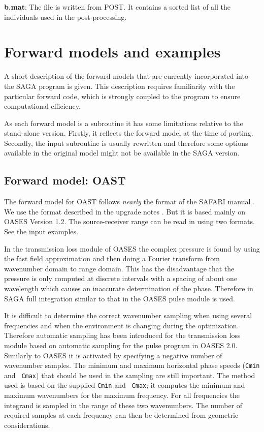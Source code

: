 \documentclass{saclantc}
\begin{document}
{\bf *b.mat}: The file is written from {\sf POST}. 
It contains a sorted list of  all the individuals used in
the post-processing. 

%
\newpage
\section{Forward models and examples}  
\label{se:forw}
A short description of the forward models that are currently
incorporated into the {\sf SAGA } program is given. This description
requires familiarity with the particular forward code, which
is strongly coupled to the program  to ensure computational
efficiency.

As each forward model is a subroutine it has some limitations relative
to the stand-alone version. Firstly, it reflects the forward model at the
time of porting. Secondly, the input subroutine is usually rewritten
and therefore some options available in the original model might not
be available in the {\sf SAGA} version.

\subsection{Forward model: OAST }
\label{se:oast}
The forward model for  {\sf OAST} \rm follows 
{\it nearly} the format of the {\sf SAFARI}
manual \cite{hs:saf}. 
We use the format described in the upgrade notes \cite{hs:saf2}.
But it is based mainly on {\sf OASES} Version 1.2.
The source-receiver range can be read in 
using two formats. See the input examples.

In the transmission loss module of {\sf OASES} the complex pressure is found
by using the fast field approximation and then doing a Fourier transform
from wavenumber domain to range domain.
This has the disadvantage that the pressure is only computed at
discrete intervals with a spacing of about one wavelength which causes
an inaccurate determination of the phase. Therefore in
{\sf SAGA}
 full integration similar to that in the {\sf OASES} pulse module is
used.

It is difficult to determine the correct wavenumber
sampling when using several frequencies and when the environment is
changing during the optimization. Therefore  automatic
sampling has been introduced for the transmission loss module
 based on automatic sampling for the pulse program in {\sf OASES} 2.0. 
Similarly to {\sf OASES} it is activated by specifying a 
negative number of wavenumber samples.
The minimum and maximum horizontal phase speeds ({\tt Cmin} and {\tt
Cmax}) 
that should be used in the sampling are still important. 
The  method used is  based on the supplied {\tt Cmin} and {\tt
Cmax}; it computes the minimum and maximum wavenumbers  for the
maximum frequency. For all frequencies the integrand is sampled in the
range of these two wavenumbers. The number of required samples at each
frequency can then be determined from geometric considerations.
\end{document}
